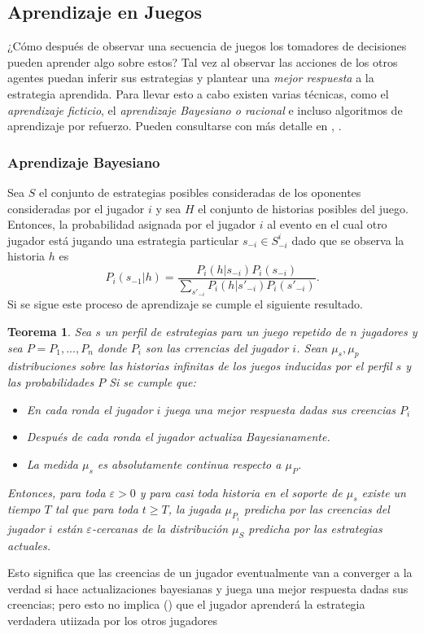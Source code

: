 \documentclass[11pt]{article}
\theoremstyle{plain}
\newtheorem{teo}{Teorema}
\begin{document}
\subsection{Aprendizaje en Juegos}
¿Cómo después de observar una secuencia de juegos los tomadores de decisiones pueden aprender algo sobre estos? Tal vez al observar las acciones de los otros agentes puedan inferir sus estrategias y plantear una \textit{mejor respuesta} a la estrategia aprendida. Para llevar esto a cabo existen varias técnicas, como el \textit{aprendizaje ficticio}, el \textit{aprendizaje Bayesiano o racional} e incluso algoritmos de aprendizaje por refuerzo. Pueden consultarse con más detalle en \cite{shoham2008multiagent}, \cite{fudenberg1998theory}. 
\subsubsection{Aprendizaje Bayesiano}
Sea $S$ el conjunto de estrategias posibles consideradas de los oponentes consideradas por el jugador $i$ y sea $H$ el conjunto de historias posibles del juego. Entonces, la probabilidad asignada por el jugador $i$ al evento en el cual otro jugador está jugando una estrategia particular $s_{-i} \in S^i_{-i}$ dado que se observa la historia $h$ es
\[ P_i(s_{-1} | h) = \frac{P_i(h|s_{-i})P_i(s_{-i})}{\sum_{s'_{-i}} P_i(h | s'_{-i})P_i(s'_{-i})}. \]
Si se sigue este proceso de aprendizaje se cumple el siguiente resultado.
\begin{teo}
Sea $s$ un perfil de estrategias para un juego repetido de $n$ jugadores y sea $P=P_1,...,P_n$ donde $P_i$ son las crrencias del jugador $i$. Sean $\mu_s, \mu_p$ distribuciones sobre las historias infinitas de los juegos inducidas por el perfil $s$ y las probabilidades $P$ Si se cumple que:
\begin{itemize}
\item En cada ronda el jugador $i$ juega una \textit{mejor respuesta} dadas sus creencias $P_i$
\item Después de cada ronda el jugador actualiza Bayesianamente.
\item La medida $\mu_s$ es absolutamente continua respecto a $\mu_P$.
\end{itemize}
Entonces, para toda $\varepsilon>0$ y para casi toda historia en el soporte de $\mu_s$ existe un tiempo $T$ tal que para toda $t \geq T$, la jugada $\mu_{P_i}$ predicha por las creencias del jugador $i$ están $\varepsilon$-cercanas de la distribución $\mu_S$ predicha por las estrategias actuales.
\end{teo}
Esto significa que las creencias de un jugador eventualmente van a converger a la verdad si hace actualizaciones bayesianas y juega una mejor respuesta dadas sus creencias; pero esto no implica (\cite{shoham2008multiagent}) que el jugador aprenderá la estrategia verdadera utiizada por los otros jugadores
\end{document}
